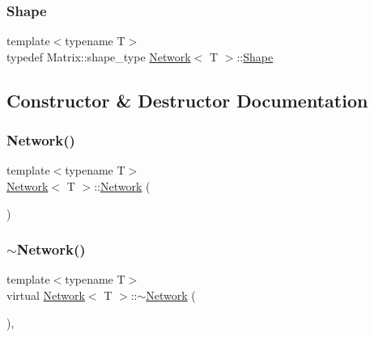\subsubsection{\texorpdfstring{Shape}{Shape}}
{\footnotesize\ttfamily template$<$typename T$>$ \\
typedef Matrix\+::shape\+\_\+type \mbox{\hyperlink{class_network}{Network}}$<$ T $>$\+::\mbox{\hyperlink{class_network_a581bef0355faccb9e6a4d4325792ec25}{Shape}}}



\subsection{Constructor \& Destructor Documentation}
\mbox{\label{class_network_aa2db3657dea83a6a152633a8eb4d41ce}} 
\subsubsection{\texorpdfstring{Network()}{Network()}}
{\footnotesize\ttfamily template$<$typename T$>$ \\
\mbox{\hyperlink{class_network}{Network}}$<$ T $>$\+::\mbox{\hyperlink{class_network}{Network}} (\begin{DoxyParamCaption}{ }\end{DoxyParamCaption})\hspace{0.3cm}{\ttfamily [default]}}

\mbox{\label{class_network_a9717c0b897ff9d602ad91f57159ba4dd}} 
\subsubsection{\texorpdfstring{$\sim$Network()}{~Network()}}
{\footnotesize\ttfamily template$<$typename T$>$ \\
virtual \mbox{\hyperlink{class_network}{Network}}$<$ T $>$\+::$\sim$\mbox{\hyperlink{class_network}{Network}} (\begin{DoxyParamCaption}{ }\end{DoxyParamCaption})\hspace{0.3cm}{\ttfamily [virtual]}, {\ttfamily [default]}}



